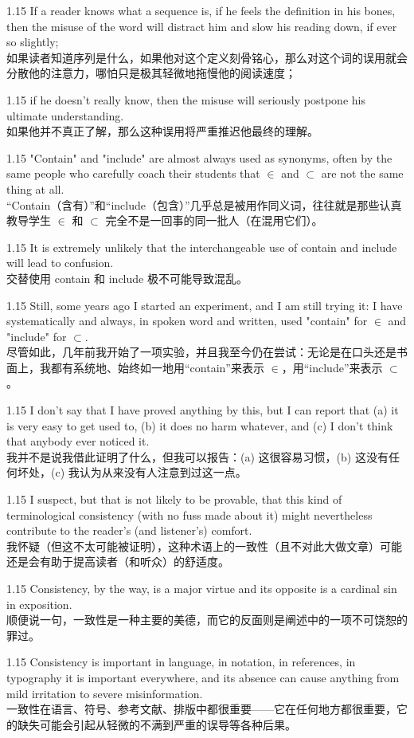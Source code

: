 \documentclass[12pt,a4paper]{article}
\newcommand{\bilingual}[2]{
    \begin{spacing}{1.15} %
        \noindent \normalsize #1 \\[-0.5ex] %
        \small \textcolor{blue!70!black}{#2} %
    \end{spacing}
    \vspace{0.8em} %
}
\begin{document}
\bilingual{If a reader knows what a sequence is, if he feels the definition in his bones, then the misuse of the word will distract him and slow his reading down, if ever so slightly;}
{如果读者知道序列是什么，如果他对这个定义刻骨铭心，那么对这个词的误用就会分散他的注意力，哪怕只是极其轻微地拖慢他的阅读速度；} %

\bilingual{if he doesn't really know, then the misuse will seriously postpone his ultimate understanding.}
{如果他并不真正了解，那么这种误用将严重推迟他最终的理解。} %

\bilingual{"Contain" and "include" are almost always used as synonyms, often by the same people who carefully coach their students that $\in$ and $\subset$ are not the same thing at all.}
{“Contain（含有）”和“include（包含）”几乎总是被用作同义词，往往就是那些认真教导学生 $\in$ 和 $\subset$ 完全不是一回事的同一批人（在混用它们）。} %

\bilingual{It is extremely unlikely that the interchangeable use of contain and include will lead to confusion.}
{交替使用 contain 和 include 极不可能导致混乱。} %

\bilingual{Still, some years ago I started an experiment, and I am still trying it: I have systematically and always, in spoken word and written, used "contain" for $\in$ and "include" for $\subset$.}
{尽管如此，几年前我开始了一项实验，并且我至今仍在尝试：无论是在口头还是书面上，我都有系统地、始终如一地用“contain”来表示 $\in$，用“include”来表示 $\subset$。} %

\bilingual{I don't say that I have proved anything by this, but I can report that (a) it is very easy to get used to, (b) it does no harm whatever, and (c) I don't think that anybody ever noticed it.}
{我并不是说我借此证明了什么，但我可以报告：(a) 这很容易习惯，(b) 这没有任何坏处，(c) 我认为从来没有人注意到过这一点。} %

\bilingual{I suspect, but that is not likely to be provable, that this kind of terminological consistency (with no fuss made about it) might nevertheless contribute to the reader's (and listener's) comfort.}
{我怀疑（但这不太可能被证明），这种术语上的一致性（且不对此大做文章）可能还是会有助于提高读者（和听众）的舒适度。} %

\bilingual{Consistency, by the way, is a major virtue and its opposite is a cardinal sin in exposition.}
{顺便说一句，一致性是一种主要的美德，而它的反面则是阐述中的一项不可饶恕的罪过。} %

\bilingual{Consistency is important in language, in notation, in references, in typography it is important everywhere, and its absence can cause anything from mild irritation to severe misinformation.}
{一致性在语言、符号、参考文献、排版中都很重要——它在任何地方都很重要，它的缺失可能会引起从轻微的不满到严重的误导等各种后果。} %
\end{document}

